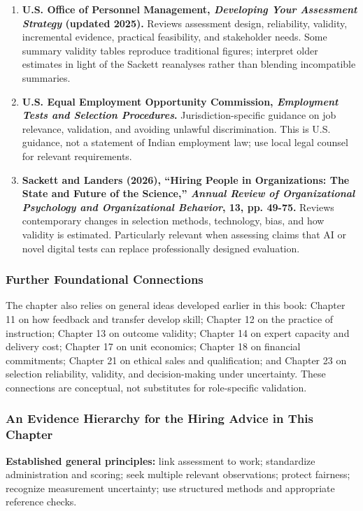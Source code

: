 \begin{enumerate}
    \item \textbf{U.S. Office of Personnel Management, \textit{Developing Your Assessment Strategy} (updated 2025).} Reviews assessment design, reliability, validity, incremental evidence, practical feasibility, and stakeholder needs. Some summary validity tables reproduce traditional figures; interpret older estimates in light of the Sackett reanalyses rather than blending incompatible summaries.
    \item \textbf{U.S. Equal Employment Opportunity Commission, \textit{Employment Tests and Selection Procedures}.} Jurisdiction-specific guidance on job relevance, validation, and avoiding unlawful discrimination. This is U.S. guidance, not a statement of Indian employment law; use local legal counsel for relevant requirements.
    \item \textbf{Sackett and Landers (2026), ``Hiring People in Organizations: The State and Future of the Science,'' \textit{Annual Review of Organizational Psychology and Organizational Behavior}, 13, pp. 49-75.} Reviews contemporary changes in selection methods, technology, bias, and how validity is estimated. Particularly relevant when assessing claims that AI or novel digital tests can replace professionally designed evaluation.
\end{enumerate}

\subsubsection*{Further Foundational Connections}

The chapter also relies on general ideas developed earlier in this book: Chapter 11 on how feedback and transfer develop skill; Chapter 12 on the practice of instruction; Chapter 13 on outcome validity; Chapter 14 on expert capacity and delivery cost; Chapter 17 on unit economics; Chapter 18 on financial commitments; Chapter 21 on ethical sales and qualification; and Chapter 23 on selection reliability, validity, and decision-making under uncertainty. These connections are conceptual, not substitutes for role-specific validation.

\subsubsection*{An Evidence Hierarchy for the Hiring Advice in This Chapter}

\textbf{Established general principles:} link assessment to work; standardize administration and scoring; seek multiple relevant observations; protect fairness; recognize measurement uncertainty; use structured methods and appropriate reference checks.

